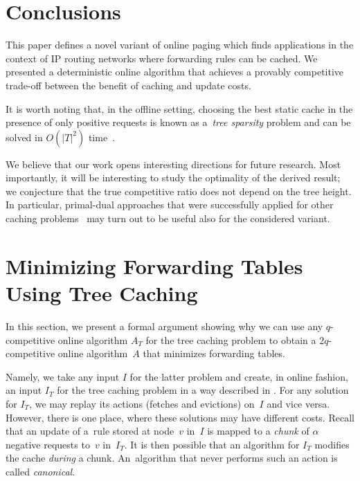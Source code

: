 

\section{Conclusions}\label{sec:conclusion}

This paper defines a novel variant of online paging which finds
applications in the context of IP routing networks where forwarding rules can
be cached. We presented a deterministic online algorithm that achieves a
provably competitive trade-off between the benefit of caching and update costs.

It is worth noting that, in the offline setting, choosing the best static cache 
in the presence of only positive requests is known as a~\emph{tree sparsity}
problem and can be solved in $O(|T|^2)$ time~\cite{tree-sparsity}.

We believe that our work opens interesting directions for future research.
Most importantly, it will be interesting to study the optimality of the
derived result; we conjecture that the true competitive ratio does not 
depend on the tree height. In particular, primal-dual approaches that were
successfully applied for other caching
problems~\cite{young-paging-greedy-dual,generalized-caching-optimal,generalized-caching-bansal} may turn out to be useful also for the considered variant. 



\section{Minimizing Forwarding Tables Using Tree Caching}
\label{sec:bisimulation}

In this section, we present a formal argument showing why we can use any
$q$-competitive online algorithm $A_T$ for the tree caching problem to obtain
a $2 q$-competitive online algorithm~$A$ that minimizes forwarding tables.

Namely, we take any input $I$ for the latter problem and create, in online
fashion, an input $I_T$ for the tree caching problem in a way described in
.
For any solution for $I_T$, we may replay its actions (fetches and evictions)
on~$I$ and vice versa. However, there is one place, where these solutions 
may have different costs. Recall that an update of a~rule stored at node~$v$
in~$I$ is mapped to a \emph{chunk} of $\alpha$ negative requests to~$v$ 
in~$I_T$. It is then possible that an algorithm for $I_T$ modifies the cache
\emph{during} a chunk. An~algorithm that never performs such an action
is called \emph{canonical}.

